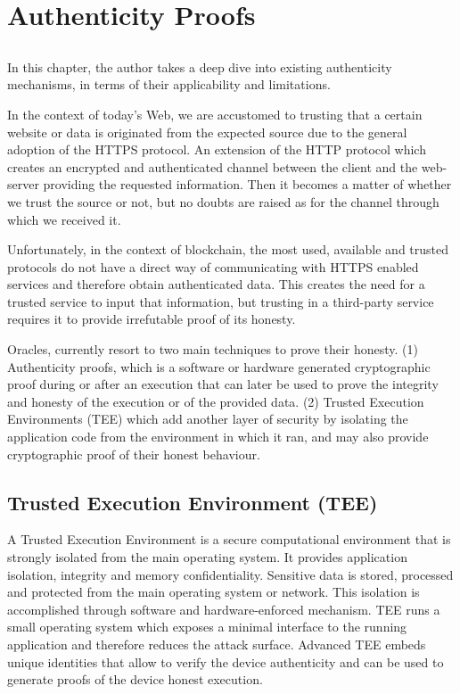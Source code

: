 \chapter{Authenticity Proofs}\label{chap:chap3}

\section*{}

In this chapter, the author takes a deep dive into existing authenticity mechanisms, in terms of their applicability and limitations.

In the context of today's Web, we are accustomed to trusting that a certain website or data is originated from the expected source due to the general adoption of the HTTPS protocol. An extension of the HTTP protocol which creates an encrypted and authenticated channel between the client and the web-server providing the requested information. Then it becomes a matter of whether we trust the source or not, but no doubts are raised as for the channel through which we received it.

Unfortunately, in the context of blockchain, the most used, available and trusted protocols do not have a direct way of communicating with HTTPS enabled services and therefore obtain authenticated data. This creates the need for a trusted service to input that information, but trusting in a third-party service requires it to provide irrefutable proof of its honesty.

Oracles, currently resort to two main techniques to prove their honesty. (1) Authenticity proofs, which is a software or hardware generated cryptographic proof during or after an execution that can later be used to prove the integrity and honesty of the execution or of the provided data. (2) Trusted Execution Environments (TEE) which add another layer of security by isolating the application code from the environment in which it ran, and may also provide cryptographic proof of their honest behaviour.

\section{Trusted Execution Environment (TEE)}
A Trusted Execution Environment is a secure computational environment that is strongly isolated from the main operating system. It provides application isolation, integrity and memory confidentiality. Sensitive data is stored, processed and protected from the main operating system or network. This isolation is accomplished through software and hardware-enforced mechanism. TEE runs a small operating system which exposes a minimal interface to the running application and therefore reduces the attack surface. Advanced TEE embeds unique identities that allow to verify the device authenticity and can be used to generate proofs of the device honest execution.

